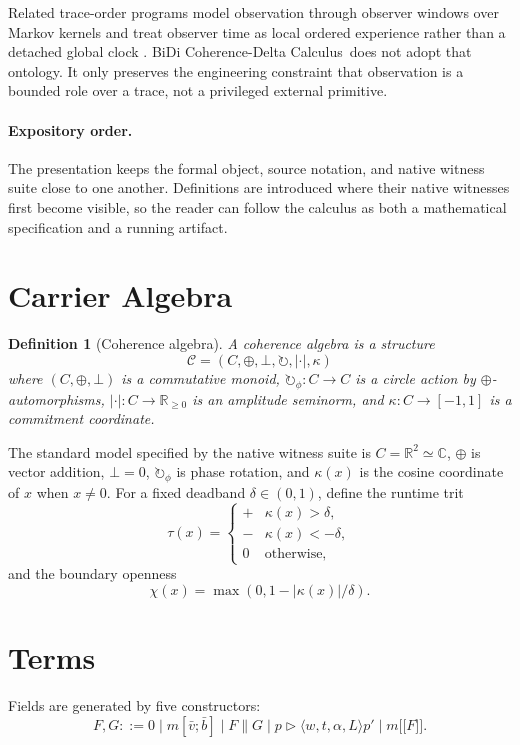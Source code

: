 \documentclass[11pt]{article}
\newtheorem{definition}{Definition}
\newcommand{\CDC}{BiDi Coherence-Delta Calculus}
\newcommand{\C}{\mathcal{C}}
\newcommand{\parcomp}{\mathbin{\|}}
\newcommand{\rot}{\circlearrowright}
\newcommand{\botv}{\bot}
\newcommand{\nest}[1]{\mathopen{[\![}#1\mathclose{]\!]}}
\begin{document}
Related trace-order programs model observation through observer windows over
Markov kernels and treat observer time as local ordered experience rather than a
detached global clock \cite{hoffman2024traces,hoffman2014time}. \CDC\ does not
adopt that ontology. It only preserves the engineering constraint that
observation is a bounded role over a trace, not a privileged external primitive.

\paragraph{Expository order.}
The presentation keeps the formal object, source notation, and native witness
suite close to one another. Definitions are introduced where their native witnesses
first become visible, so the reader can follow the calculus as both a mathematical
specification and a running artifact.

\section{Carrier Algebra}

\begin{definition}[Coherence algebra]
A coherence algebra is a structure
\[
\C = (C,\oplus,\botv,\rot,|\cdot|,\kappa)
\]
where $(C,\oplus,\botv)$ is a commutative monoid, $\rot_\phi:C\to C$ is a circle
action by $\oplus$-automorphisms, $|\cdot|:C\to\mathbb{R}_{\geq 0}$ is an
amplitude seminorm, and $\kappa:C\to[-1,1]$ is a commitment coordinate.
\end{definition}

The standard model specified by the native witness suite is $C=\mathbb{R}^2 \simeq
\mathbb{C}$, $\oplus$ is vector addition, $\botv=0$, $\rot_\phi$ is phase
rotation, and $\kappa(x)$ is the cosine coordinate of $x$ when $x\ne 0$.
For a fixed deadband $\delta\in(0,1)$, define the runtime trit
\[
\tau(x)=
\begin{cases}
+ & \kappa(x)>\delta,\\
- & \kappa(x)<-\delta,\\
0 & \text{otherwise,}
\end{cases}
\]
and the boundary openness
\[
\chi(x)=\max(0,1-|\kappa(x)|/\delta).
\]

\section{Terms}

Fields are generated by five constructors:
\[
F,G ::= 0
  \mid m[\bar v;\bar b]
  \mid F\parcomp G
  \mid p \triangleright \langle w,t,\alpha,L\rangle p'
  \mid m\nest{F} .
\]
\end{document}

